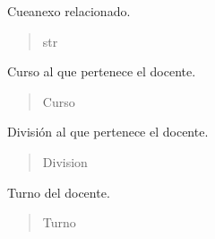 \documentclass[letterpaper,10pt,spanish]{sphinxmanual}
\begin{document}
\begin{fulllineitems}
\begin{fulllineitems}
\end{fulllineitems}



\begin{fulllineitems}

\pysigstartsignatures
{}
\pysigstopsignatures
\sphinxAtStartPar
Cueanexo relacionado.
\begin{quote}\begin{description}
\sphinxAtStartPar
str

\end{description}\end{quote}

\end{fulllineitems}



\begin{fulllineitems}

\pysigstartsignatures
{}
\pysigstopsignatures
\sphinxAtStartPar
Curso al que pertenece el docente.
\begin{quote}\begin{description}
\sphinxAtStartPar
Curso

\end{description}\end{quote}

\end{fulllineitems}



\begin{fulllineitems}

\pysigstartsignatures
{}
\pysigstopsignatures
\sphinxAtStartPar
División al que pertenece el docente.
\begin{quote}\begin{description}
\sphinxAtStartPar
Division

\end{description}\end{quote}

\end{fulllineitems}



\begin{fulllineitems}

\pysigstartsignatures
{}
\pysigstopsignatures
\sphinxAtStartPar
Turno del docente.
\begin{quote}\begin{description}
\sphinxAtStartPar
Turno


\end{description}
\end{quote}
\end{fulllineitems}
\end{fulllineitems}
\end{document}
